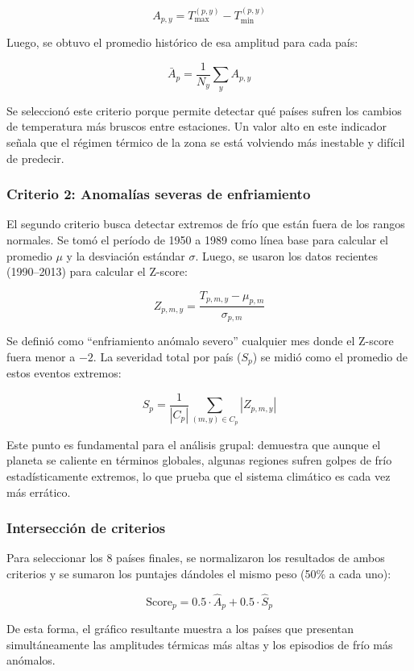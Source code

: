 \documentclass[12pt, a4paper]{article}
\begin{document}
\[
A_{p,y} = T_{\max}^{(p,y)} - T_{\min}^{(p,y)}
\]

Luego, se obtuvo el promedio histórico de esa amplitud para cada país:

\[
\bar{A}_p = \frac{1}{N_y} \sum_{y} A_{p,y}
\]

Se seleccionó este criterio porque permite detectar qué países sufren los cambios de temperatura más bruscos entre estaciones. Un valor alto en este indicador señala que el régimen térmico de la zona se está volviendo más inestable y difícil de predecir.

\subsubsection{Criterio 2: Anomalías severas de enfriamiento}

El segundo criterio busca detectar extremos de frío que están fuera de los rangos normales. Se tomó el período de 1950 a 1989 como línea base para calcular el promedio $\mu$ y la desviación estándar $\sigma$. Luego, se usaron los datos recientes (1990--2013) para calcular el Z-score:

\[
Z_{p,m,y} = \frac{T_{p,m,y} - \mu_{p,m}}{\sigma_{p,m}}
\]

Se definió como ``enfriamiento anómalo severo'' cualquier mes donde el Z-score fuera menor a $-2$. La severidad total por país ($S_p$) se midió como el promedio de estos eventos extremos:

\[
S_p = \frac{1}{|C_p|} \sum_{(m,y) \in C_p} |Z_{p,m,y}|
\]

Este punto es fundamental para el análisis grupal: demuestra que aunque el planeta se caliente en términos globales, algunas regiones sufren golpes de frío estadísticamente extremos, lo que prueba que el sistema climático es cada vez más errático.

\subsubsection{Intersección de criterios}

Para seleccionar los 8 países finales, se normalizaron los resultados de ambos criterios y se sumaron los puntajes dándoles el mismo peso (50\% a cada uno):

\[
\text{Score}_p = 0.5 \cdot \hat{A}_p + 0.5 \cdot \hat{S}_p
\]

De esta forma, el gráfico resultante muestra a los países que presentan simultáneamente las amplitudes térmicas más altas y los episodios de frío más anómalos.
\end{document}

